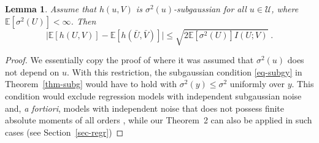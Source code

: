 \documentclass[11pt]{article}
\newtheorem{lemma}{Lemma}
\def\U{\mathcal{U}}
\def\EXP {{\mathbb E}}
\begin{document}
\begin{lemma}
\label{lem-RagRakXulemma}
Assume that $h(u,V)$ is $\sigma^2(u)$-subgaussian for all $u\in \U$, where $\EXP[\sigma^2(U)]<\infty$. Then 
\[
\big| \EXP[h(U,V)] - \EXP[h(\bar{U},\bar{V})] \big| \le 
\sqrt{2 \EXP[\sigma^2(U)] I(U;V)}\; .
\]
\end{lemma}

\begin{proof}
We essentially copy the proof of    \cite[Lemma~10.2]{RaRaXu21} where it was assumed that $\sigma^2(u)$ does not depend on $u$. With this restriction, the subgaussian condition \eqref{eq-subgy} in Theorem~\ref{thm-subg} would have to hold with $\sigma^2(y)\le \sigma^2$ uniformly over $y$. This condition  would exclude regression models with independent subgaussian noise and, \emph{a fortiori},  models with independent noise that does not possess finite absolute moments of all orders , while our Theorem~2 can also be applied  in such cases  (see Section~\ref{sec-regr})


\end{proof}
\end{document}
